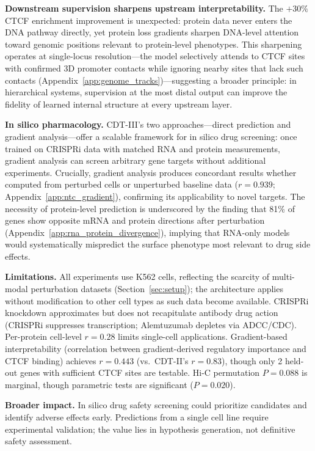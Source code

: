 \documentclass{article}
\begin{document}
\textbf{Downstream supervision sharpens upstream interpretability.}
The $+30\%$ CTCF enrichment improvement is unexpected: protein data never enters the DNA pathway directly, yet protein loss gradients sharpen DNA-level attention toward genomic positions relevant to protein-level phenotypes. This sharpening operates at single-locus resolution---the model selectively attends to CTCF sites with confirmed 3D promoter contacts while ignoring nearby sites that lack such contacts (Appendix~\ref{app:genome_tracks})---suggesting a broader principle: in hierarchical systems, supervision at the most distal output can improve the fidelity of learned internal structure at every upstream layer.

\textbf{In silico pharmacology.}
CDT-III's two approaches---direct prediction and gradient analysis---offer a scalable framework for in silico drug screening: once trained on CRISPRi data with matched RNA and protein measurements, gradient analysis can screen arbitrary gene targets without additional experiments. Crucially, gradient analysis produces concordant results whether computed from perturbed cells or unperturbed baseline data ($r = 0.939$; Appendix~\ref{app:ntc_gradient}), confirming its applicability to novel targets. The necessity of protein-level prediction is underscored by the finding that 81\% of genes show opposite mRNA and protein directions after perturbation (Appendix~\ref{app:rna_protein_divergence}), implying that RNA-only models would systematically mispredict the surface phenotype most relevant to drug side effects.

\textbf{Limitations.}
All experiments use K562 cells, reflecting the scarcity of multi-modal perturbation datasets (Section~\ref{sec:setup}); the architecture applies without modification to other cell types as such data become available.
CRISPRi knockdown approximates but does not recapitulate antibody drug action (CRISPRi suppresses transcription; Alemtuzumab depletes via ADCC/CDC).
Per-protein cell-level $r = 0.28$ limits single-cell applications. Gradient-based interpretability (correlation between gradient-derived regulatory importance and CTCF binding) achieves $r = 0.443$ (vs.\ CDT-II's $r = 0.83$), though only 2 held-out genes with sufficient CTCF sites are testable. Hi-C permutation $P = 0.088$ is marginal, though parametric tests are significant ($P = 0.020$).

\textbf{Broader impact.}
In silico drug safety screening could prioritize candidates and identify adverse effects early. Predictions from a single cell line require experimental validation; the value lies in hypothesis generation, not definitive safety assessment.
\end{document}
